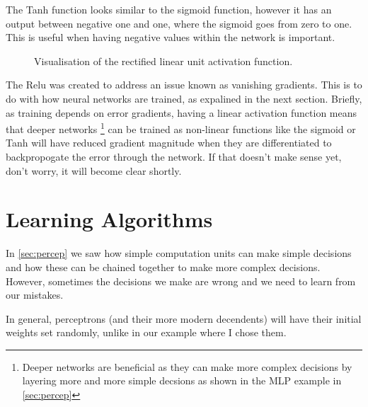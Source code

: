 The Tanh function looks similar to the sigmoid function, however it has an output between negative one and one, where the sigmoid goes from zero to one. This is useful when having negative values within the network is important.

\begin{figure}
\begin{center}
\caption{Visualisation of the rectified linear unit activation function.}
\label{fig:activation_relu}
\end{center}
\end{figure}

The Relu was created to address an issue known as vanishing gradients. This is to do with how neural networks are trained, as expalined in the next section. Briefly, as training depends on error gradients, having a linear activation function means that deeper networks \footnote{Deeper networks are beneficial as they can make more complex decisions by layering more and more simple decsions as shown in the MLP example in \autoref{sec:percep}} can be trained as non-linear functions like the sigmoid or Tanh will have reduced gradient magnitude when they are differentiated to backpropogate the error through the network. If that doesn't make sense yet, don't worry, it will become clear shortly.

\section{Learning Algorithms}
In \autoref{sec:percep} we saw how simple computation units can make simple decisions and how these can be chained together to make more complex decisions. However, sometimes the decisions we make are wrong and we need to learn from our mistakes.

In general, perceptrons (and their more modern decendents) will have their initial weights set randomly, unlike in our example where I chose them. 

